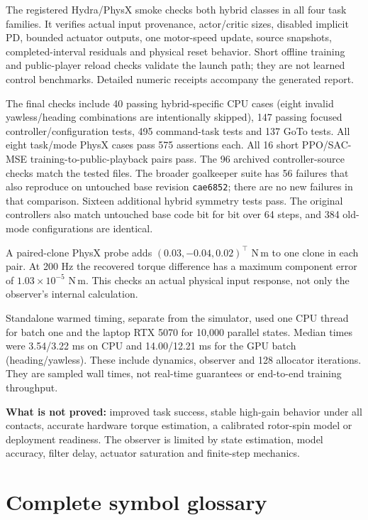 \documentclass[11pt,a4paper]{article}
\begin{document}
The registered Hydra/PhysX smoke checks both hybrid classes in all four task
families. It verifies actual input provenance, actor/critic sizes, disabled
implicit PD, bounded actuator outputs, one motor-speed update, source snapshots,
completed-interval residuals and physical reset behavior. Short offline training
and public-player reload checks validate the launch path; they are not learned
control benchmarks. Detailed numeric receipts accompany the generated report.

The final checks include 40 passing hybrid-specific CPU cases (eight invalid
yawless/heading combinations are intentionally skipped), 147 passing focused
controller/configuration tests, 495 command-task tests and 137 GoTo tests.
All eight task/mode PhysX cases pass 575 assertions each. All 16 short
PPO/SAC-MSE training-to-public-playback pairs pass. The 96 archived controller-source
checks match the tested files. The broader goalkeeper suite has 56 failures
that also reproduce on untouched base revision \texttt{cae6852}; there are no
new failures in that comparison. Sixteen additional hybrid symmetry tests pass.
The original controllers also match untouched base code bit for bit over 64
steps, and 384 old-mode configurations are identical.

A paired-clone PhysX probe adds $(0.03,-0.04,0.02)^\top$ N\,m to one clone in
each pair. At 200 Hz the recovered torque difference has a maximum component
error of $1.03\times10^{-5}$ N\,m. This checks an actual physical input response,
not only the observer's internal calculation.

Standalone warmed timing, separate from the simulator, used one CPU thread for
batch one and the laptop RTX 5070 for 10,000 parallel states. Median times were
3.54/3.22 ms on CPU and 14.00/12.21 ms for the GPU batch (heading/yawless).
These include dynamics, observer and 128 allocator iterations. They are sampled
wall times, not real-time guarantees or end-to-end training throughput.

\textbf{What is not proved:} improved task success, stable high-gain behavior
under all contacts, accurate hardware torque estimation, a calibrated rotor-spin
model or deployment readiness. The observer is limited by state estimation,
model accuracy, filter delay, actuator saturation and finite-step mechanics.

\section{Complete symbol glossary}\label{sec:glossary}
\end{document}
